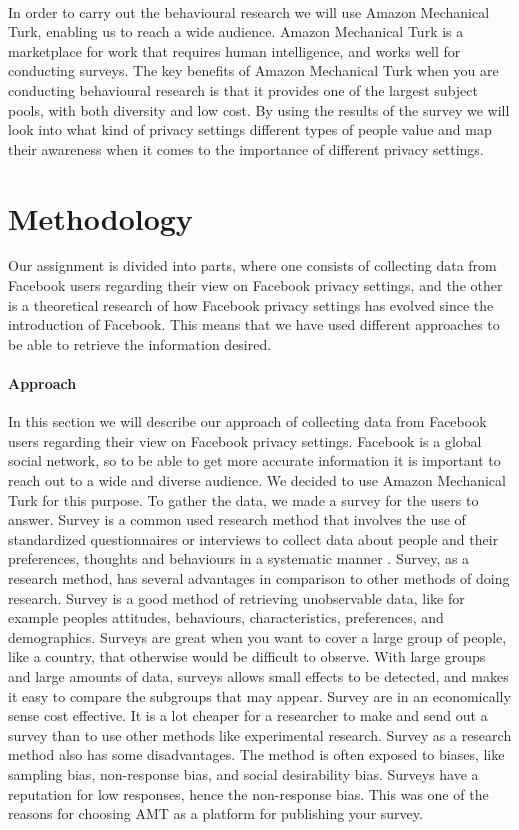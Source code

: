 \paragraph{}
In order to carry out the behavioural research we will use Amazon Mechanical Turk, enabling us to reach a wide audience. Amazon Mechanical Turk is a marketplace for work that requires human intelligence, and works well for conducting surveys.
The key benefits of Amazon Mechanical Turk when you are conducting behavioural research is that it provides one of the largest subject pools, with both diversity and low cost. By using the results of the survey we will look into what kind of privacy settings different types of people value and map their awareness when it comes to the importance of different privacy settings. 

\section{Methodology}
\label{sec:methodology}
Our assignment is divided into parts, where one consists of collecting data from Facebook users regarding their view on Facebook privacy settings, and the other is a theoretical research of how Facebook privacy settings has evolved since the introduction of Facebook. This means that we have used different approaches to be able to retrieve the information desired.

\paragraph{Approach}
In this section we will describe our approach of collecting data from Facebook users regarding their view on Facebook privacy settings. Facebook is a global social network, so to be able to get more accurate information it is important to reach out to a wide and diverse audience. We decided to use Amazon Mechanical Turk for this purpose. To gather the data, we made a survey for the users to answer. Survey is a common used research method that involves the use of standardized questionnaires or interviews to collect data about people and their preferences, thoughts and behaviours in a systematic manner \cite{survey}. Survey, as a research method, has several advantages in comparison to other methods of doing research. Survey is a good method of retrieving unobservable data, like for example peoples attitudes, behaviours, characteristics, preferences, and demographics. Surveys are great when you want to cover a large group of people, like a country, that otherwise would be difficult to observe. With large groups and large amounts of data, surveys allows small effects to be detected, and makes it easy to compare the subgroups that may appear. Survey are in an economically sense cost effective. It is a lot cheaper for a researcher to make and send out a survey than to use other methods like experimental research. Survey as a research method also has some disadvantages. The method is often exposed to biases, like sampling bias, non-response bias, and social desirability bias. Surveys have a reputation for low responses, hence the non-response bias. This was one of the reasons for choosing AMT as a platform for publishing your survey. 

